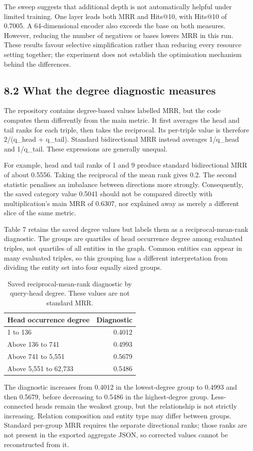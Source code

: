 \documentclass[11pt]{article}
\begin{document}
The sweep suggests that additional depth is not automatically helpful under limited training. One layer leads both MRR and Hits@10, with Hits@10 of 0.7005. A 64-dimensional encoder also exceeds the base on both measures. However, reducing the number of negatives or bases lowers MRR in this run. These results favour selective simplification rather than reducing every resource setting together; the experiment does not establish the optimisation mechanism behind the differences.

\subsection*{8.2 What the degree diagnostic measures}
The repository contains degree-based values labelled MRR, but the code computes them differently from the main metric. It first averages the head and tail ranks for each triple, then takes the reciprocal. Its per-triple value is therefore 2/(q\_head + q\_tail). Standard bidirectional MRR instead averages 1/q\_head and 1/q\_tail. These expressions are generally unequal.

For example, head and tail ranks of 1 and 9 produce standard bidirectional MRR of about 0.5556. Taking the reciprocal of the mean rank gives 0.2. The second statistic penalises an imbalance between directions more strongly. Consequently, the saved category value 0.5041 should not be compared directly with multiplication's main MRR of 0.6307, nor explained away as merely a different slice of the same metric.

Table 7 retains the saved degree values but labels them as a reciprocal-mean-rank diagnostic. The groups are quartiles of head occurrence degree among evaluated triples, not quartiles of all entities in the graph. Common entities can appear in many evaluated triples, so this grouping has a different interpretation from dividing the entity set into four equally sized groups.

\begin{table}[t]\centering\small
\setlength{\tabcolsep}{3pt}
\begin{tabular}{lr}
\toprule
Head occurrence degree & Diagnostic \\ \midrule
1 to 136 & 0.4012 \\
Above 136 to 741 & 0.4993 \\
Above 741 to 5,551 & 0.5679 \\
Above 5,551 to 62,733 & 0.5486 \\
\bottomrule\end{tabular}
\caption{Saved reciprocal-mean-rank diagnostic by query-head degree. These values are not standard MRR.}\end{table}
The diagnostic increases from 0.4012 in the lowest-degree group to 0.4993 and then 0.5679, before decreasing to 0.5486 in the highest-degree group. Less-connected heads remain the weakest group, but the relationship is not strictly increasing. Relation composition and entity type may differ between groups. Standard per-group MRR requires the separate directional ranks; those ranks are not present in the exported aggregate JSON, so corrected values cannot be reconstructed from it.
\end{document}

